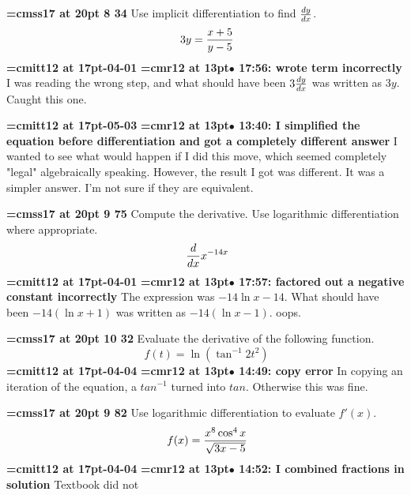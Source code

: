 {\medskip\noindent\bf\font\titlefont=cmss17 at 20pt 8 34}\medskip
Use implicit differentiation to find ${dy \over dx}$.
$$\
3y = {x + 5 \over y - 5}
$$
{\medskip\noindent\bf\font\titlefont=cmitt12 at 17pt-04-01}\medskip
{\smallskip\noindent\bf\font\titlefont=cmr12 at 13pt\titlefont $\bullet$ 17:56: wrote term incorrectly}\smallskip
I was reading the wrong step, and what should have been $3{dy \over dx}$ was written as $3y$. Caught this one.
\par

{\medskip\noindent\bf\font\titlefont=cmitt12 at 17pt-05-03}\medskip
{\smallskip\noindent\bf\font\titlefont=cmr12 at 13pt\titlefont $\bullet$ 13:40: I simplified the equation before differentiation and got a completely different answer}\smallskip
I wanted to see what would happen if I did this move, which seemed completely "legal" algebraically speaking. However, the result I got was different. It was a simpler answer. I'm not sure if they are equivalent.
\par

{\medskip\noindent\bf\font\titlefont=cmss17 at 20pt 9 75}\medskip
Compute the derivative. Use logarithmic differentiation where
appropriate.
$$\
{d \over dx}
x^{-14x}
$$
{\medskip\noindent\bf\font\titlefont=cmitt12 at 17pt-04-01}\medskip
{\smallskip\noindent\bf\font\titlefont=cmr12 at 13pt\titlefont $\bullet$ 17:57: factored out a negative constant incorrectly}\smallskip
The expression was $-14\ln x - 14$. What should have been $-14(\ln x + 1)$ was written as $-14 (\ln x - 1)$. oops.
\par

{\medskip\noindent\bf\font\titlefont=cmss17 at 20pt 10 32}\medskip
Evaluate the derivative of the following function.
$$\
f(t) = \ln (\tan^{-1} 2t^{2})
$$
{\medskip\noindent\bf\font\titlefont=cmitt12 at 17pt-04-04}\medskip
{\smallskip\noindent\bf\font\titlefont=cmr12 at 13pt\titlefont $\bullet$ 14:49: copy error}\smallskip
In copying an iteration of the equation, a $tan^{-1}$ turned into $tan$. Otherwise this was fine.
\par

\xrdef{node107}
{\medskip\noindent\bf\font\titlefont=cmss17 at 20pt 9 82}\medskip
Use logarithmic differentiation to evaluate $f'(x)$.
$$\
f(x) = {
x^8\cos^4 x
\over
\sqrt{3x - 5}
}
$$
{\medskip\noindent\bf\font\titlefont=cmitt12 at 17pt-04-04}\medskip
{\smallskip\noindent\bf\font\titlefont=cmr12 at 13pt\titlefont $\bullet$ 14:52: I combined fractions in solution}\smallskip
Textbook did not
\par

